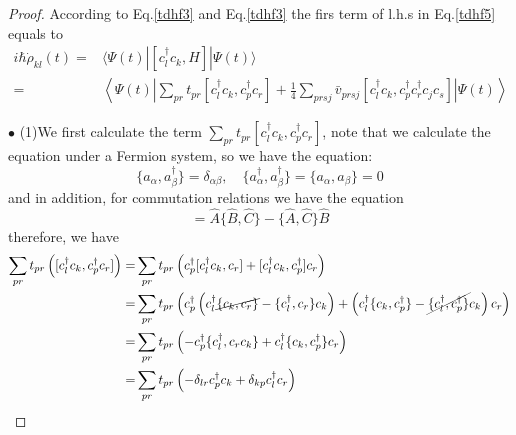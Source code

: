   \begin{proof}
    According to Eq.\eqref{tdhf3} and Eq.\eqref{tdhf3}  the firs term of l.h.s in Eq.\eqref{tdhf5} equals to
    \begin{equation}
      \begin{aligned}
        i\hbar\dot{\rho}_{kl}(t) =& \langle \Psi(t) | [c_l^\dagger c_k, H] | \Psi(t) \rangle \\
                                 =& \left\langle \Psi(t) \left| \sum_{pr}t_{pr}[c_l^\dagger c_k, c_p^\dagger c_r] + \frac{1}{4}\sum_{prsj}\bar{v}_{prsj}[c_l^\dagger c_k, c_p^\dagger c_r^\dagger c_jc_s] \right| \Psi(t) \right\rangle  \label{tdhf8}
      \end{aligned}
    \end{equation}

    $\bullet$ (1)We first calculate the term $\sum\limits_{pr}t_{pr}[c_l^\dagger c_k, c_p^\dagger c_r]$, note that we calculate the equation under a Fermion system, so we have the equation:
    \begin{equation}
      \{a_\alpha, a_\beta^\dagger\} = \delta_{\alpha\beta}, \quad  \{a_\alpha^\dagger, a_\beta^\dagger\} = \{a_\alpha, a_\beta\} = 0 \label{tdhf9}
    \end{equation}
    and in addition, for commutation relations we have the  equation
    \begin{equation}
      [\hat{A}\hat{B}, \hat{C}] = \hat{A}\{\hat{B}, \hat{C}\} - \{\hat{A}, \hat{C}\}\hat{B} \label{tdhf10}
    \end{equation}
    therefore, we have
    \begin{equation}
      \begin{aligned}
      \sum_{pr}t_{pr}\left([c_l^\dagger c_k, c_p^\dagger c_r]\right) =& \sum_{pr}t_{pr}\left(c_p^\dagger [c_l^\dagger c_k,c_r] + [c_l^\dagger c_k,c_p^\dagger ]c_r\right)\\
                        =& \sum_{pr}t_{pr}\left(c_p^\dagger \left( c_l^\dagger \cancel{\{{c_k, c_r}\}} - \{{c_l^\dagger, c_r}\}c_k \right) + \left( c_l^\dagger\{c_k, c_p^\dagger\} - \cancel{\{c_l^\dagger, c_p^\dagger\}}c_k \right)c_r\right)\\
                        =& \sum_{pr}t_{pr}\left(-c_p^\dagger \{{c_l^\dagger, c_r}c_k\} + c_l^\dagger\{c_k, c_p^\dagger\}c_r\right)\\
                        =& \sum_{pr}t_{pr}\left(-\delta_{lr}c_p^\dagger c_k + \delta_{kp}c_l^\dagger c_r\right) \label{tdhf11}
      \end{aligned}
    \end{equation}

\end{proof}
